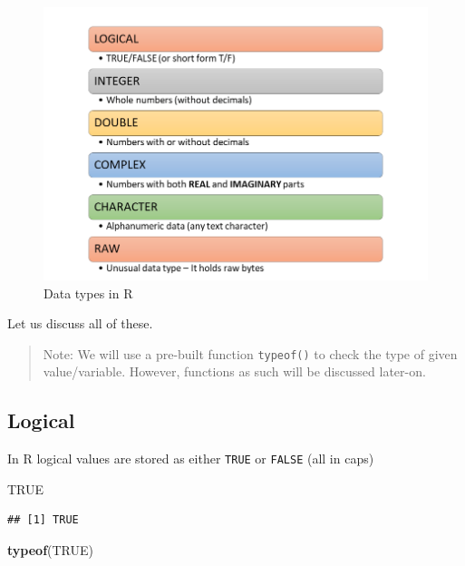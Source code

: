 \documentclass[
]{book}
\newenvironment{Shaded}{\begin{snugshade}}{\end{snugshade}}
\newcommand{\ConstantTok}[1]{\textcolor[rgb]{0.56,0.35,0.01}{#1}}
\newcommand{\FunctionTok}[1]{\textcolor[rgb]{0.13,0.29,0.53}{\textbf{#1}}}
\newcommand{\NormalTok}[1]{#1}
\begin{document}
\begin{figure}

{\centering \includegraphics[width=11.92in,height=0.6\textheight]{images/datatypes} 

}

\caption{Data types in R}\label{fig:datatypes}
\end{figure}

Let us discuss all of these.

\begin{quote}
Note: We will use a pre-built function \texttt{typeof()} to check the type of given value/variable. However, functions as such will be discussed later-on.
\end{quote}

\hypertarget{logical}{%
\subsection{Logical}\label{logical}}

In R logical values are stored as either \texttt{TRUE} or \texttt{FALSE} (all in caps)

\begin{Shaded}
\begin{Highlighting}[]
\ConstantTok{TRUE}
\end{Highlighting}
\end{Shaded}

\begin{verbatim}
## [1] TRUE
\end{verbatim}

\begin{Shaded}
\begin{Highlighting}[]
\FunctionTok{typeof}\NormalTok{(}\ConstantTok{TRUE}\NormalTok{)}
\end{Highlighting}
\end{Shaded}
\end{document}
